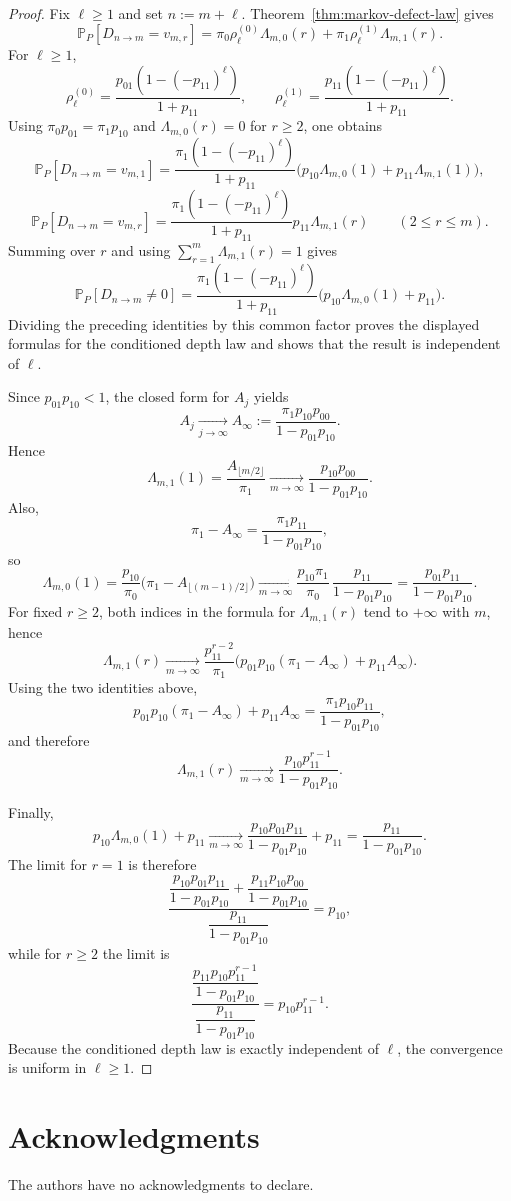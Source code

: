 \documentclass[11pt,reqno]{amsart}
\numberwithin{equation}{section}
\theoremstyle{plain}
\theoremstyle{definition}
\theoremstyle{remark}
\newcommand{\PP}{\mathbb{P}}
\begin{document}
\begin{proof}
Fix $\ell\ge 1$ and set $n:=m+\ell$.  Theorem~\ref{thm:markov-defect-law}
gives
\[
\PP_P[D_{n\to m}=v_{m,r}]
=
\pi_0\rho_\ell^{(0)}\Lambda_{m,0}(r)
+
\pi_1\rho_\ell^{(1)}\Lambda_{m,1}(r).
\]
For $\ell\ge 1$,
\[
\rho_\ell^{(0)}
=
\frac{p_{01}(1-(-p_{11})^\ell)}{1+p_{11}},
\qquad
\rho_\ell^{(1)}
=
\frac{p_{11}(1-(-p_{11})^\ell)}{1+p_{11}}.
\]
Using $\pi_0p_{01}=\pi_1p_{10}$ and $\Lambda_{m,0}(r)=0$ for $r\ge 2$, one
obtains
\[
\PP_P[D_{n\to m}=v_{m,1}]
=
\frac{\pi_1(1-(-p_{11})^\ell)}{1+p_{11}}
\bigl(
p_{10}\Lambda_{m,0}(1)+p_{11}\Lambda_{m,1}(1)
\bigr),
\]
\[
\PP_P[D_{n\to m}=v_{m,r}]
=
\frac{\pi_1(1-(-p_{11})^\ell)}{1+p_{11}}
p_{11}\Lambda_{m,1}(r)
\qquad (2\le r\le m).
\]
Summing over $r$ and using $\sum_{r=1}^m\Lambda_{m,1}(r)=1$ gives
\[
\PP_P[D_{n\to m}\ne 0]
=
\frac{\pi_1(1-(-p_{11})^\ell)}{1+p_{11}}
\bigl(
p_{10}\Lambda_{m,0}(1)+p_{11}
\bigr).
\]
Dividing the preceding identities by this common factor proves the displayed
formulas for the conditioned depth law and shows that the result is independent
of $\ell$.

Since $p_{01}p_{10}<1$, the closed form for $A_j$ yields
\[
A_j\xrightarrow[j\to\infty]{}
A_\infty
:=
\frac{\pi_1p_{10}p_{00}}{1-p_{01}p_{10}}.
\]
Hence
\[
\Lambda_{m,1}(1)
=
\frac{A_{\lfloor m/2\rfloor}}{\pi_1}
\xrightarrow[m\to\infty]{}
\frac{p_{10}p_{00}}{1-p_{01}p_{10}}.
\]
Also,
\[
\pi_1-A_\infty
=
\frac{\pi_1p_{11}}{1-p_{01}p_{10}},
\]
so
\[
\Lambda_{m,0}(1)
=
\frac{p_{10}}{\pi_0}
\bigl(
\pi_1-A_{\lfloor (m-1)/2\rfloor}
\bigr)
\xrightarrow[m\to\infty]{}
\frac{p_{10}\pi_1}{\pi_0}\,
\frac{p_{11}}{1-p_{01}p_{10}}
=
\frac{p_{01}p_{11}}{1-p_{01}p_{10}}.
\]
For fixed $r\ge 2$, both indices in the formula for $\Lambda_{m,1}(r)$ tend to
$+\infty$ with $m$, hence
\[
\Lambda_{m,1}(r)
\xrightarrow[m\to\infty]{}
\frac{p_{11}^{r-2}}{\pi_1}
\bigl(
p_{01}p_{10}(\pi_1-A_\infty)+p_{11}A_\infty
\bigr).
\]
Using the two identities above,
\[
p_{01}p_{10}(\pi_1-A_\infty)+p_{11}A_\infty
=
\frac{\pi_1p_{10}p_{11}}{1-p_{01}p_{10}},
\]
and therefore
\[
\Lambda_{m,1}(r)
\xrightarrow[m\to\infty]{}
\frac{p_{10}p_{11}^{r-1}}{1-p_{01}p_{10}}.
\]

Finally,
\[
p_{10}\Lambda_{m,0}(1)+p_{11}
\xrightarrow[m\to\infty]{}
\frac{p_{10}p_{01}p_{11}}{1-p_{01}p_{10}}+p_{11}
=
\frac{p_{11}}{1-p_{01}p_{10}}.
\]
The limit for $r=1$ is therefore
\[
\frac{
\dfrac{p_{10}p_{01}p_{11}}{1-p_{01}p_{10}}
+
\dfrac{p_{11}p_{10}p_{00}}{1-p_{01}p_{10}}
}{
\dfrac{p_{11}}{1-p_{01}p_{10}}
}
=
p_{10},
\]
while for $r\ge 2$ the limit is
\[
\frac{
\dfrac{p_{11}p_{10}p_{11}^{r-1}}{1-p_{01}p_{10}}
}{
\dfrac{p_{11}}{1-p_{01}p_{10}}
}
=
p_{10}p_{11}^{r-1}.
\]
Because the conditioned depth law is exactly independent of $\ell$, the
convergence is uniform in $\ell\ge 1$.
\end{proof}

\section*{Acknowledgments}

The authors have no acknowledgments to declare.



\end{document}
